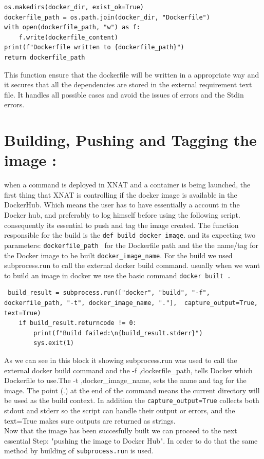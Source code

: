 \begin{lstlisting}
os.makedirs(docker_dir, exist_ok=True)
dockerfile_path = os.path.join(docker_dir, "Dockerfile")
with open(dockerfile_path, "w") as f:
    f.write(dockerfile_content)
print(f"Dockerfile written to {dockerfile_path}")
return dockerfile_path
\end{lstlisting}

This function ensure that the dockerfile will be written in a appropriate way and it secures that all the dependencies are stored in the external requirement text file. It handles all possible cases and avoid the issues of errors and the Stdin errors. 

\section{Building, Pushing and Tagging the image :}

when a command is deployed in XNAT and a container is being launched, the first thing that XNAT is controlling if the docker image is available in the DockerHub. Which means the user has to have essentially a account in the Docker hub, and preferably to log himself before using the following script.  consequently its essential to push and tag the image created.
The function responsible for the build is the \texttt{def build\_docker\_image}. and its expecting two parameters: 
\texttt{dockerfile\_path } for the Dockerfile path and the the name/tag for the Docker image to be built \texttt{docker\_image\_name}. For the build we used subprocess.run to call the external docker build command.
usually when we want to build an image in docker we use the basic command \texttt{docker built  .} 


\begin{lstlisting}
 build_result = subprocess.run(["docker", "build", "-f", dockerfile_path, "-t", docker_image_name, "."],  capture_output=True, text=True)
    if build_result.returncode != 0:
        print(f"Build failed:\n{build_result.stderr}")
        sys.exit(1)
\end{lstlisting}

As we can see in this block it showing  subprocess.run was used  to call the external docker build command and the -f ,dockerfile\_path, tells Docker which Dockerfile to use.The  -t ,docker\_image\_name, sets the name and tag for the image. The point (.) at the end of the command means the current directory will be used as the build context. In addition the \texttt{capture\_output=True} collects both stdout and stderr so the script can handle their output or errors, and the text=True makes sure outputs are returned as strings.
\\Now that the image has been succesfully built we can proceed  to the next essential Step:  "pushing the image to Docker Hub". In order to do that the same method by building of \texttt{subprocess.run} is used.


